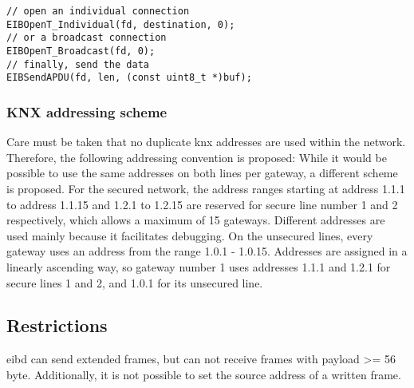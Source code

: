 \begin{lstlisting}[style=cStyle,caption={Writing to \gls{knx} frames},label=lst:knxWrite]
// open an individual connection
EIBOpenT_Individual(fd, destination, 0);
// or a broadcast connection
EIBOpenT_Broadcast(fd, 0);
// finally, send the data
EIBSendAPDU(fd, len, (const uint8_t *)buf);
\end{lstlisting}

\subsubsection{KNX addressing scheme}

Care must be taken that no duplicate \gls{knx} addresses are used within the network. Therefore, the following addressing convention is proposed:
While it would be possible to use the same addresses on both lines per gateway, a different scheme is proposed.
For the secured network, the address ranges starting at address 1.1.1 to address 1.1.15 and 1.2.1 to 1.2.15 are reserved for secure line number
1 and 2 respectively, which allows a maximum of 15 gateways. Different addresses are used mainly because it facilitates debugging. 
On the unsecured lines, every gateway uses an address from the range 1.0.1 - 1.0.15. Addresses are assigned in a linearly ascending way, so gateway number 1
uses addresses 1.1.1 and 1.2.1 for secure lines 1 and 2, and 1.0.1 for its unsecured line.

\subsection{Restrictions }

\gls{eibd} can send extended frames, but can not receive frames with payload >= 56 byte. Additionally, it is not possible to set the source address of a written frame.  

